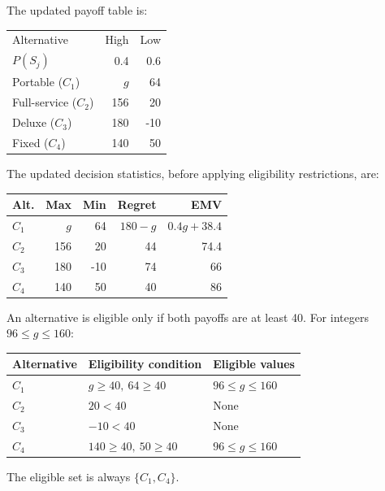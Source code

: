 The updated payoff table is:

\begin{center}\small\setlength{\tabcolsep}{4pt}
	\begin{tabular}{lrr}\toprule
		Alternative & High & Low\\
		$P(S_j)$ & 0.4 & 0.6\\ \midrule
		Portable ($C_1$) & $g$ & 64\\
		Full-service ($C_2$) & 156 & 20\\
		Deluxe ($C_3$) & 180 & -10\\
		Fixed ($C_4$) & 140 & 50\\
		\bottomrule
	\end{tabular}
\end{center}

The updated decision statistics, before applying
eligibility restrictions, are:

\begin{center}\small\setlength{\tabcolsep}{4pt}
	\begin{tabular}{lrrrr}\toprule
		Alt. & Max & Min & Regret & EMV\\ \midrule
		$C_1$ & $g$ & 64 & $180-g$ & $0.4g+38.4$\\
		$C_2$ & 156 & 20 & 44 & 74.4\\
		$C_3$ & 180 & -10 & 74 & 66\\
		$C_4$ & 140 & 50 & 40 & 86\\
		\bottomrule
	\end{tabular}
\end{center}

An alternative is eligible only if both payoffs
are at least 40. For integers $96\le g\le160$:

\begin{center}
	\begin{tabular}{lll}\toprule
		Alternative & Eligibility condition & Eligible values\\\midrule
		$C_1$ & $g\ge40,\ 64\ge40$ & $96\le g\le160$\\
		$C_2$ & $20<40$ & None\\
		$C_3$ & $-10<40$ & None\\
		$C_4$ & $140\ge40,\ 50\ge40$ & $96\le g\le160$\\
		\bottomrule
	\end{tabular}
\end{center}

The eligible set is always $\{C_1,C_4\}$.
\secInicio[sec:q2]

\label{sol:q2c}
